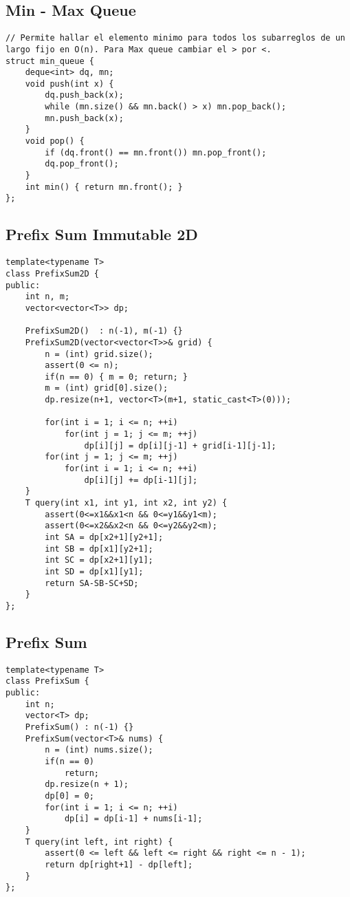 \documentclass[10pt,letterpaper,twocolumn,twosided]{article}
\begin{document}
\subsection{Min - Max Queue}
\begin{lstlisting}
// Permite hallar el elemento minimo para todos los subarreglos de un largo fijo en O(n). Para Max queue cambiar el > por <.
struct min_queue {
    deque<int> dq, mn;
    void push(int x) {
        dq.push_back(x);
        while (mn.size() && mn.back() > x) mn.pop_back();
        mn.push_back(x);
    }
    void pop() {
        if (dq.front() == mn.front()) mn.pop_front();
        dq.pop_front();
    }
    int min() { return mn.front(); }
};
\end{lstlisting}

\vfill

\subsection{Prefix Sum Immutable 2D}
\begin{lstlisting}
template<typename T>
class PrefixSum2D {
public:
    int n, m;
    vector<vector<T>> dp;

    PrefixSum2D()  : n(-1), m(-1) {}
    PrefixSum2D(vector<vector<T>>& grid) {
        n = (int) grid.size();
        assert(0 <= n);
        if(n == 0) { m = 0; return; }
        m = (int) grid[0].size();
        dp.resize(n+1, vector<T>(m+1, static_cast<T>(0)));
        
        for(int i = 1; i <= n; ++i)
            for(int j = 1; j <= m; ++j)
                dp[i][j] = dp[i][j-1] + grid[i-1][j-1];
        for(int j = 1; j <= m; ++j)
            for(int i = 1; i <= n; ++i)
                dp[i][j] += dp[i-1][j];
    }
    T query(int x1, int y1, int x2, int y2) {
        assert(0<=x1&&x1<n && 0<=y1&&y1<m);
        assert(0<=x2&&x2<n && 0<=y2&&y2<m);
        int SA = dp[x2+1][y2+1];
        int SB = dp[x1][y2+1];
        int SC = dp[x2+1][y1];
        int SD = dp[x1][y1];
        return SA-SB-SC+SD;
    }
};
\end{lstlisting}

\subsection{Prefix Sum}
\begin{lstlisting}
template<typename T>
class PrefixSum {
public:
    int n;
    vector<T> dp;
    PrefixSum() : n(-1) {}
    PrefixSum(vector<T>& nums) {
        n = (int) nums.size();
        if(n == 0)
            return;
        dp.resize(n + 1);
        dp[0] = 0;
        for(int i = 1; i <= n; ++i)
            dp[i] = dp[i-1] + nums[i-1];
    }
    T query(int left, int right) {
        assert(0 <= left && left <= right && right <= n - 1);
        return dp[right+1] - dp[left];
    }
};
\end{lstlisting}
\end{document}
